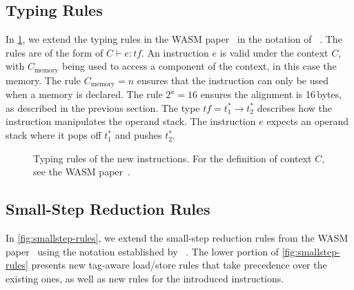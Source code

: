 \subsection{Typing Rules}
\label{subsec:typing}

In \cref{fig:typing-rules}, we extend the typing rules in the \ac{WASM} paper~\cite{haas2017bringing} in the notation of \citeauthor*{pierce2002types}~\cite{pierce2002types}.
The rules are of the form of $C \vdash e : \mathit{tf}$.
An instruction $e$ is valid under the context $C$, with $C_\text{memory}$ being used to access a component of the context, in this case the memory.
The rule $C_\text{memory} = n$ ensures that the instruction can only be used when a memory is declared.
The rule $2^a=16$ ensures the alignment is 16\,bytes, as described in the previous section.
The type $\mathit{tf} = t_1^* \rightarrow t_2^*$ describes how the instruction manipulates the operand stack.
The instruction $e$ expects an operand stack where it pops off $t_1^*$ and pushes $t_2^*$.

\begin{figure}[t]
    \begin{prooftree}
    \end{prooftree}
    \begin{prooftree}
    \end{prooftree}
    \begin{prooftree}
    \end{prooftree}
    \caption{Typing rules of the new instructions. For the definition of context $C$, see the \ac{WASM} paper~\cite{haas2017bringing}.}
    \label{fig:typing-rules}
\end{figure}

\subsection{Small-Step Reduction Rules}
\label{subsec:small-step-reduction-rules}

In \cref{fig:smallstep-rules}, we extend the small-step reduction rules from the WASM paper~\cite{haas2017bringing} using the notation established by \citeauthor*{plotkin1981structural}~\cite{plotkin1981structural}.
The lower portion of  \cref{fig:smallstep-rules} presents new tag-aware load/store rules that take precedence over the existing ones, as well as new rules for the introduced instructions.


